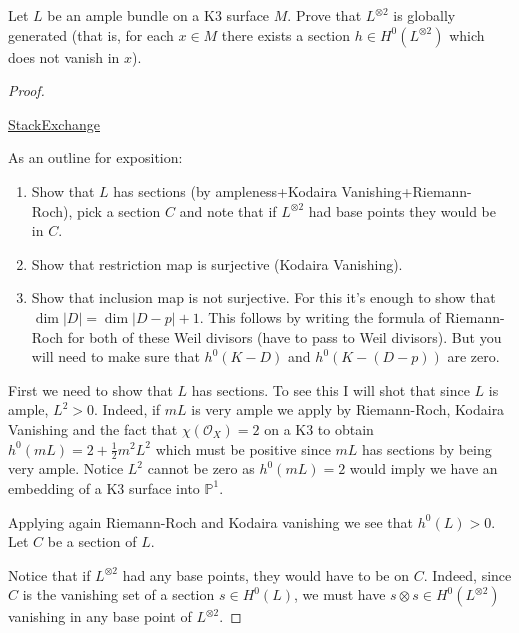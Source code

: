 \begin{exercise}
\label{exercise-L-ample-implies-Lotimes2-globally-generated}
Let $L$ be an ample bundle on a K3 surface $M$. Prove that $L^{\otimes 2}$ is
globally generated (that is, for each $x \in M$ there exists a section $h \in
H^{0}(L^{\otimes 2})$ which does not vanish in $x$).
\end{exercise}

\begin{proof}
\begin{reference}
\href{https://math.stackexchange.com/questions/5081481/
ample-line-bundle-on-a-k3-surface-implies-l-otimes-2-is-base-point-free/
5081492?noredirect=1#comment10928708_5081492}{StackExchange}
\end{reference}
As an outline for exposition:
\begin{enumerate}
\item Show that $L$ has sections (by ampleness+Kodaira Vanishing+Riemann-Roch), 
pick a section $C$ and note that if 
$L^{\otimes2}$ had base points they would be in $C$.
\item Show that restriction map is surjective (Kodaira Vanishing).
\item Show that inclusion map is not surjective. For this it's enough to show
that $\dim|D|=\dim|D-p|+1$. This follows by writing the formula of Riemann-Roch
for both of these Weil divisors (have to pass to Weil divisors). But you will
need to make sure that $h^0(K-D)$ and $h^0(K-(D-p))$ are zero.
\end{enumerate}

First we need to show that $L$ has sections. To see this I will shot that since
$L$ is ample, $L^2>0$. Indeed, if $mL$ is very ample we apply by Riemann-Roch,
 Kodaira Vanishing and the fact that $\chi(\mathcal{O}_X)=2$ on a K3 to obtain 
$h^0(mL)=2+\frac{1}{2}m^2L^2$ which must be positive since $mL$ has sections by
being very ample. Notice $L^2$ cannot be zero as $h^0(mL)=2$ would imply we have
an embedding of a K3 surface into $\mathbb{P}^1$.

Applying again Riemann-Roch and Kodaira vanishing we see that $h^0(L)>0$. Let
$C$ be a section of $L$.

Notice that if $L^{\otimes 2}$
had any base points, they would have to be on $C$. Indeed, since $C$ is the
vanishing set of a section $s\in H^{0}(L)$, we must have $s \otimes s \in
H^{0}(L^{\otimes 2})$ vanishing in any base point of $L^{\otimes 2}$.


\end{proof}
